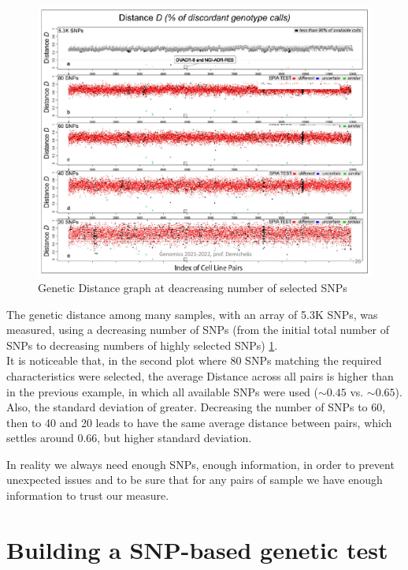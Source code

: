 \begin{figure}[ht]
	\centering
	\includegraphics[width=1\textwidth]{Selected_SNP.PNG}
	\caption{Genetic Distance graph at deacreasing number of selected SNPs}
	\label{fig:sel_snp}
\end{figure}

The genetic distance among many samples, with an array of 5.3K SNPs, was
measured, using a decreasing number of SNPs (from the initial total number of
SNPs to decreasing numbers of highly selected SNPs) \ref{fig:sel_snp}. \\

It is noticeable that, in the second plot where 80 SNPs matching the required
characteristics were selected, the average Distance across all pairs is higher
than in the previous example, in which all available SNPs were used ($\sim 0.45$
vs. $\sim 0.65$). Also, the standard deviation of greater. Decreasing the number
of SNPs to 60, then to 40 and 20 leads to have the same average distance between
pairs, which settles around 0.66, but higher standard deviation.

In reality we always need enough SNPs, enough information, in order to prevent
unexpected issues and to be sure that for any pairs of sample we have enough
information to trust our measure. 


\section{Building a SNP-based genetic test}

